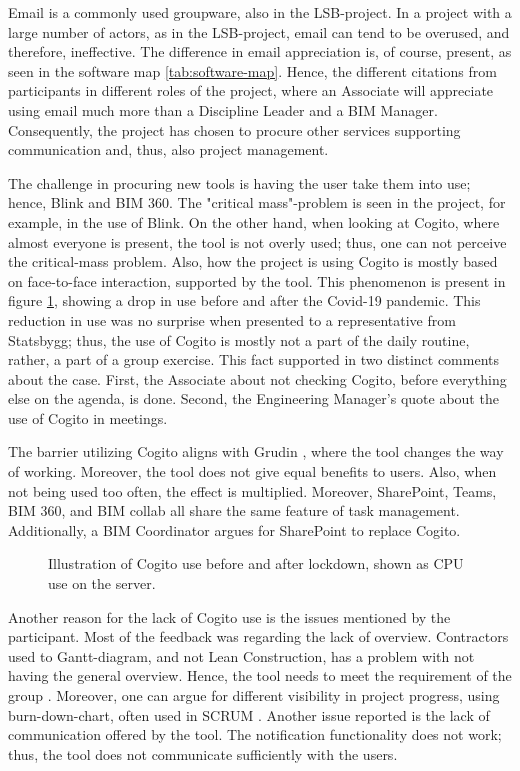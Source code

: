 Email is a commonly used groupware, also in the LSB-project. In a project with a large number of actors, as in the LSB-project, email can tend to be overused, and therefore, ineffective. The difference in email appreciation is, of course, present, as seen in the software map \ref{tab:software-map}. Hence, the different citations from participants in different roles of the project, where an Associate will appreciate using email much more than a Discipline Leader and a BIM Manager. Consequently, the project has chosen to procure other services supporting communication and, thus, also project management.

The challenge in procuring new tools is having the user take them into use; hence, Blink and BIM 360. The "critical mass"-problem \cite{markus1987toward} is seen in the project, for example, in the use of Blink. On the other hand, when looking at Cogito, where almost everyone is present, the tool is not overly used; thus, one can not perceive the critical-mass problem. Also, how the project is using Cogito is mostly based on face-to-face interaction, supported by the tool. This phenomenon is present in figure \ref{fig:cogito_use}, showing a drop in use before and after the Covid-19 pandemic. This reduction in use was no surprise when presented to a representative from Statsbygg; thus, the use of Cogito is mostly not a part of the daily routine, rather, a part of a group exercise. This fact supported in two distinct comments about the case. First, the Associate about not checking Cogito, before everything else on the agenda, is done. Second, the Engineering Manager's quote about the use of Cogito in meetings. 

The barrier utilizing Cogito aligns with Grudin \cite{grudin1989groupware}, where the tool changes the way of working. Moreover, the tool does not give equal benefits to users. Also, when not being used too often, the effect is multiplied. Moreover, SharePoint, Teams, BIM 360, and BIM collab all share the same feature of task management. Additionally, a BIM Coordinator argues for SharePoint to replace Cogito.

\begin{figure}
    \centering

    \caption{Illustration of Cogito use before and after lockdown, shown as CPU use on the server.}
    \label{fig:cogito_use}
\end{figure}

Another reason for the lack of Cogito use is the issues mentioned by the participant. Most of the feedback was regarding the lack of overview. Contractors used to Gantt-diagram, and not Lean Construction, has a problem with not having the general overview. Hence, the tool needs to meet the requirement of the group \cite{subramanyam2010user}. Moreover, one can argue for different visibility in project progress, using burn-down-chart, often used in SCRUM \cite{sutherland}. Another issue reported is the lack of communication offered by the tool. The notification functionality does not work; thus, the tool does not communicate sufficiently with the users. 

